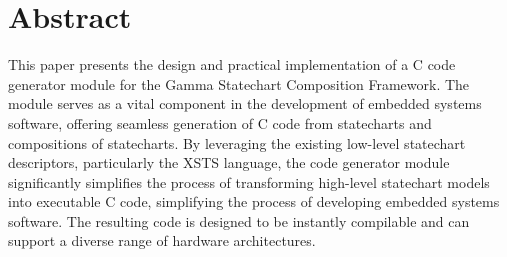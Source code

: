 \setcounter{page}{1}

\chapter*{Abstract}

This paper presents the design and practical implementation of a C code generator module for the Gamma Statechart Composition Framework. The module serves as a vital component in the development of embedded systems software, offering seamless generation of C code from statecharts and compositions of statecharts. By leveraging the existing low-level statechart descriptors, particularly the XSTS language, the code generator module significantly simplifies the process of transforming high-level statechart models into executable C code, simplifying the process of developing embedded systems software. The resulting code is designed to be instantly compilable and can support a diverse range of hardware architectures.

\vfill
\cleardoublepage

\selectthesislanguage

\setcounter{romanPage}{\value{page}}
